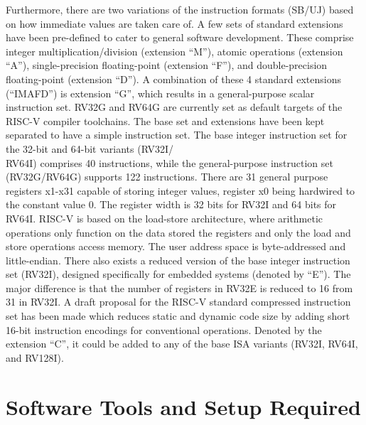 Furthermore, there are two variations of the instruction formats (SB/UJ) based on how immediate values are taken care of. A few sets of standard extensions have been pre-defined to cater to general software development. These comprise integer multiplication/division (extension “M”), atomic operations (extension “A”), single-precision floating-point (extension “F”), and double-precision floating-point (extension “D”). A combination of these 4 standard extensions (“IMAFD”) is extension “G”, which results in a general-purpose scalar instruction set. RV32G and RV64G are currently set as default targets of the RISC-V compiler toolchains. The base set and extensions have been kept separated to have a simple instruction set. \newline
The base integer instruction set for the 32-bit and 64-bit variants (RV32I/\\RV64I) comprises 40 instructions, while the general-purpose instruction set (RV32G/RV64G) supports 122 instructions. There are 31 general purpose registers x1-x31 capable of storing integer values, register x0 being hardwired to the constant value 0. The register width is 32 bits for RV32I and 64 bits for RV64I. RISC-V is based on the load-store architecture, where arithmetic operations only function on the data stored the registers and only the load and store operations access memory. The user address space is byte-addressed and little-endian. \newline\newline
There also exists a reduced version of the base integer instruction set (RV32I), designed specifically for embedded systems (denoted by “E”). The major difference is that the number of registers in RV32E is reduced to 16 from 31 in RV32I. A draft proposal for the RISC-V standard compressed instruction set has been made which reduces static and dynamic code size by adding short 16-bit instruction encodings for conventional operations. Denoted by the extension “C”, it could be added to any of the base ISA variants (RV32I, RV64I, and RV128I). 

 \section{Software Tools and Setup Required}
  \label{sect6_2}

